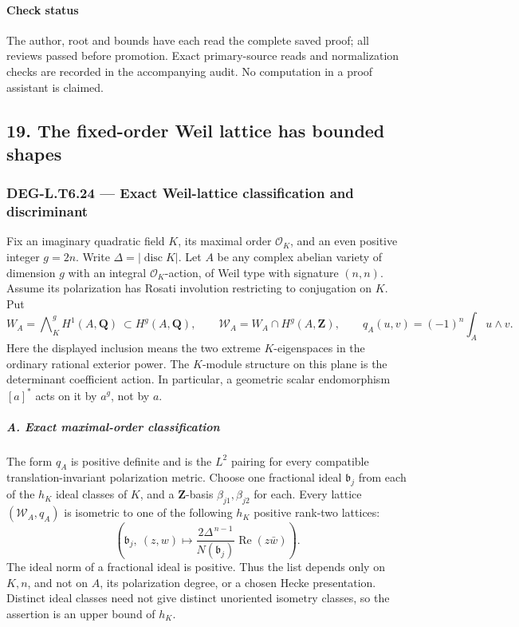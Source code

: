 \documentclass[11pt,a4paper]{article}
\theoremstyle{definition}
\begin{document}
\paragraph{Check status}\label{check-status-3}

The author, root and bounds have each read the complete saved proof; all reviews passed before promotion. Exact primary-source reads and normalization checks are recorded in the accompanying audit. No computation in a proof assistant is claimed.

\subsection{19. The fixed-order Weil lattice has bounded shapes}\label{the-fixed-order-weil-lattice-has-bounded-shapes}

\subsubsection{DEG-L.T6.24 --- Exact Weil-lattice classification and discriminant}\label{DEG-L.T6.24}

Fix an imaginary quadratic field \(K\), its maximal order \(\mathcal O_K\), and an even positive integer \(g=2n\). Write \(\Delta=|\operatorname{disc}K|\). Let \(A\) be any complex abelian variety of dimension \(g\) with an integral \(\mathcal O_K\)-action, of Weil type with signature \((n,n)\). Assume its polarization has Rosati involution restricting to conjugation on \(K\). Put \[
 W_A=\bigwedge\nolimits_K^g H^1(A,\mathbf Q)
       \ \subset H^g(A,\mathbf Q),\qquad
 \mathscr W_A=W_A\cap H^g(A,\mathbf Z),
 \qquad q_A(u,v)=(-1)^n\int_Au\wedge v.
 \tag{T24.1}
\] Here the displayed inclusion means the two extreme \(K\)-eigenspaces in the ordinary rational exterior power. The \(K\)-module structure on this plane is the determinant coefficient action. In particular, a geometric scalar endomorphism \([a]^*\) acts on it by \(a^g\), not by \(a\).

\subparagraph{A. Exact maximal-order classification}\label{a.-exact-maximal-order-classification}

The form \(q_A\) is positive definite and is the \(L^2\) pairing for every compatible translation-invariant polarization metric. Choose one fractional ideal \(\mathfrak b_j\) from each of the \(h_K\) ideal classes of \(K\), and a \(\mathbf Z\)-basis \(\beta_{j1},\beta_{j2}\) for each. Every lattice \((\mathscr W_A,q_A)\) is isometric to one of the following \(h_K\) positive rank-two lattices: \[
 \left(\mathfrak b_j,\ 
        (z,w)\longmapsto
        \frac{2\Delta^{\,n-1}}{N(\mathfrak b_j)}
                      \operatorname{Re}(z\bar w)\right).
 \tag{T24.2}
\] The ideal norm of a fractional ideal is positive. Thus the list depends only on \(K,n\), and not on \(A\), its polarization degree, or a chosen Hecke presentation. Distinct ideal classes need not give distinct unoriented isometry classes, so the assertion is an upper bound of \(h_K\).
\end{document}
